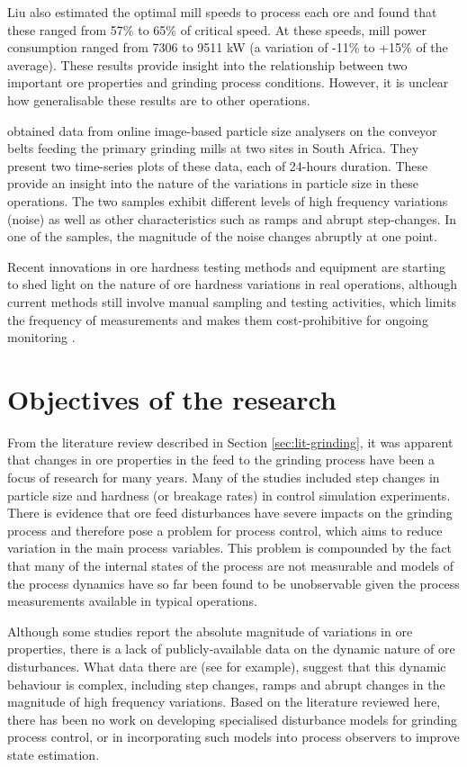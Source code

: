 Liu also estimated the optimal mill speeds to process each ore and found that these ranged from 57\% to 65\% of critical speed. At these speeds, mill power consumption ranged from 7306 to 9511 kW (a variation of -11\% to +15\% of the average). These results provide insight into the relationship between two important ore properties and grinding process conditions. However, it is unclear how generalisable these results are to other operations.

\cite{steyn_investigating_2018} obtained data from online image-based particle size analysers on the conveyor belts feeding the primary grinding mills at two sites in South Africa. They present two time-series plots of these data, each of 24-hours duration. These provide an insight into the nature of the variations in particle size in these operations. The two samples exhibit different levels of high frequency variations (noise) as well as other characteristics such as ramps and abrupt step-changes. In one of the samples, the magnitude of the noise changes abruptly at one point.

Recent innovations in ore hardness testing methods and equipment are starting to shed light on the nature of ore hardness variations in real operations, although current methods still involve manual sampling and testing activities, which limits the frequency of measurements and makes them cost-prohibitive for ongoing monitoring \citep{kojovic_value_2019}.


\section{Objectives of the research} \label{sec:objectives}

From the literature review described in Section \ref{sec:lit-grinding}, it was apparent that changes in ore properties in the feed to the grinding process have been a focus of research for many years. Many of the studies included step changes in particle size and hardness (or breakage rates) in control simulation experiments. There is evidence that ore feed disturbances have severe impacts on the grinding process and therefore pose a problem for process control, which aims to reduce variation in the main process variables. This problem is compounded by the fact that many of the internal states of the process are not measurable and models of the process dynamics have so far been found to be unobservable given the process measurements available in typical operations. 

Although some studies report the absolute magnitude of variations in ore properties, there is a lack of publicly-available data on the dynamic nature of ore disturbances. What data there are (see \cite{steyn_investigating_2018} for example), suggest that this dynamic behaviour is complex, including step changes, ramps and abrupt changes in the magnitude of high frequency variations. Based on the literature reviewed here, there has been no work on developing specialised disturbance models for grinding process control, or in incorporating such models into process observers to improve state estimation.

